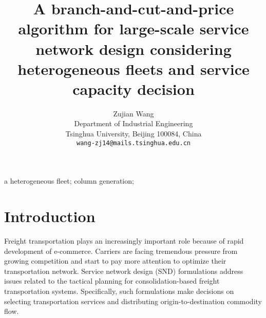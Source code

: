 \documentclass[11pt,nonblindrev,fleqn]{article}
\newcommand{\singlespace}{\renewcommand{\baselinestretch}{1}\small\normalsize}
\newcommand{\doublespace}{\renewcommand{\baselinestretch}{1.5}\small\normalsize}
\begin{document}
\singlespace

\begin{titlepage}
\title{A branch-and-cut-and-price algorithm for large-scale service network design considering heterogeneous fleets and service capacity decision}
\author{
	Zujian Wang \\
	\small{Department of Industrial Engineering} \\
	\small{Tsinghua University, Beijing 100084, China} \\
	\small{\tt wang-zj14@mails.tsinghua.edu.cn} \\
	}
\date{} %
\end{titlepage}
\maketitle



\vspace{.25in}

 a heterogeneous fleet; column generation;





\doublespace
\section{Introduction}
Freight transportation plays an increasingly important role because of rapid development of e-commerce. Carriers are facing tremendous pressure from growing competition and start to pay more attention to optimize their transportation network. Service network design (SND) formulations address issues related to the tactical planning for consolidation-based freight transportation systems. Specifically, such formulations make decisions on selecting transportation services and distributing origin-to-destination commodity flow.
\end{document}
